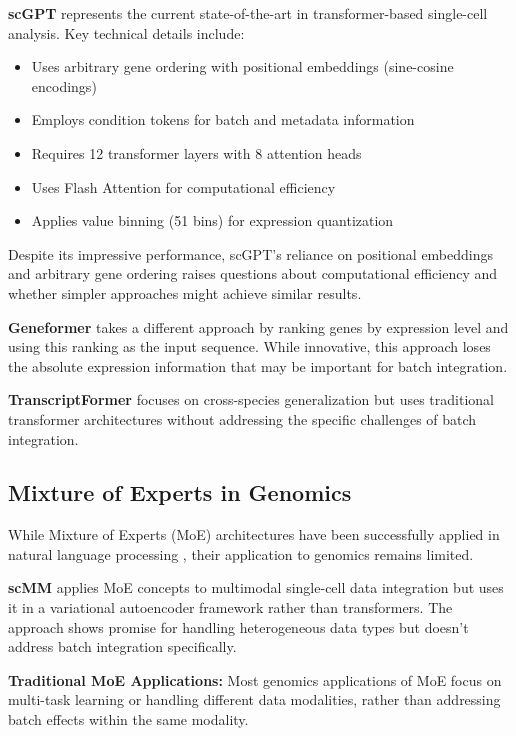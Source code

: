 \textbf{scGPT} \citep{cui2024scgpt} represents the current state-of-the-art in transformer-based single-cell analysis. Key technical details include:
\begin{itemize}
\item Uses arbitrary gene ordering with positional embeddings (sine-cosine encodings)
\item Employs condition tokens for batch and metadata information
\item Requires 12 transformer layers with 8 attention heads
\item Uses Flash Attention for computational efficiency
\item Applies value binning (51 bins) for expression quantization
\end{itemize}

Despite its impressive performance, scGPT's reliance on positional embeddings and arbitrary gene ordering raises questions about computational efficiency and whether simpler approaches might achieve similar results.

\textbf{Geneformer} \citep{theodoris2023transfer} takes a different approach by ranking genes by expression level and using this ranking as the input sequence. While innovative, this approach loses the absolute expression information that may be important for batch integration.

\textbf{TranscriptFormer} \citep{transcriptformer2024} focuses on cross-species generalization but uses traditional transformer architectures without addressing the specific challenges of batch integration.

\subsection{Mixture of Experts in Genomics}

While Mixture of Experts (MoE) architectures have been successfully applied in natural language processing \citep{fedus2021switch}, their application to genomics remains limited.

\textbf{scMM} \citep{minoura2021mixture} applies MoE concepts to multimodal single-cell data integration but uses it in a variational autoencoder framework rather than transformers. The approach shows promise for handling heterogeneous data types but doesn't address batch integration specifically.

\textbf{Traditional MoE Applications:} Most genomics applications of MoE focus on multi-task learning or handling different data modalities, rather than addressing batch effects within the same modality.

